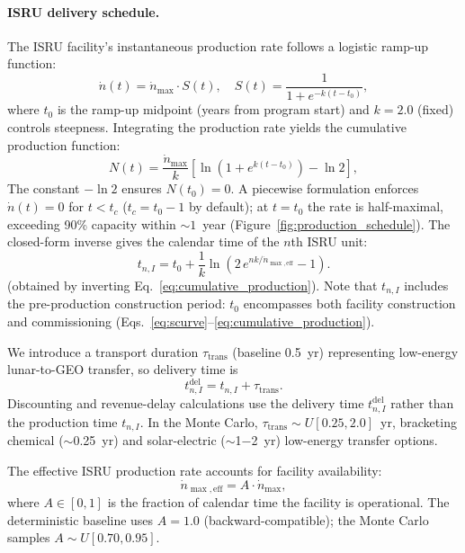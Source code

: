 \documentclass[preprint,12pt]{elsarticle}
\begin{document}
\paragraph{ISRU delivery schedule.} The ISRU facility's instantaneous production rate follows a logistic ramp-up function:
\begin{equation}
  \dot{n}(t) = \dot{n}_{\max} \cdot S(t), \quad S(t) = \frac{1}{1 + e^{-k(t - t_0)}},
  \label{eq:scurve}
\end{equation}
where $t_0$ is the ramp-up midpoint (years from program start) and $k = 2.0$ (fixed) controls steepness. Integrating the production rate yields the cumulative production function:
\begin{equation}
  N(t) = \frac{\dot{n}_{\max}}{k} \left[ \ln\!\left(1 + e^{k(t - t_0)}\right) - \ln 2 \right],
  \label{eq:cumulative_production}
\end{equation}
The constant $-\ln 2$ ensures $N(t_0) = 0$. A piecewise formulation enforces $\dot{n}(t) = 0$ for $t < t_c$ ($t_c = t_0 - 1$ by default); at $t = t_0$ the rate is half-maximal, exceeding 90\% capacity within ${\sim}1$~year (Figure~\ref{fig:production_schedule}). The closed-form inverse gives the calendar time of the $n$th ISRU unit:
\begin{equation}
  t_{n,I} = t_0 + \frac{1}{k} \ln\!\left(2\,e^{nk/\dot{n}_{\max,\mathrm{eff}}} - 1\right).
  \label{eq:production_schedule}
\end{equation}
(obtained by inverting Eq.~\ref{eq:cumulative_production}). Note that $t_{n,I}$ includes the pre-production construction period: $t_0$ encompasses both facility construction and commissioning (Eqs.~\ref{eq:scurve}--\ref{eq:cumulative_production}).

We introduce a transport duration $\tau_{\mathrm{trans}}$ (baseline 0.5~yr) representing low-energy lunar-to-GEO transfer, so delivery time is
\begin{equation}
  t_{n,I}^{\mathrm{del}} = t_{n,I} + \tau_{\mathrm{trans}}.
  \label{eq:delivery_time}
\end{equation}
Discounting and revenue-delay calculations use the delivery time $t_{n,I}^{\mathrm{del}}$ rather than the production time $t_{n,I}$. In the Monte Carlo, $\tau_{\mathrm{trans}} \sim U[0.25, 2.0]$~yr, bracketing chemical ($\sim$0.25~yr) and solar-electric ($\sim$1$-$2~yr) low-energy transfer options.

The effective ISRU production rate accounts for facility availability:
\begin{equation}
  \dot{n}_{\max,\mathrm{eff}} = A \cdot \dot{n}_{\max},
  \label{eq:availability}
\end{equation}
where $A \in [0,1]$ is the fraction of calendar time the facility is operational. The deterministic baseline uses $A = 1.0$ (backward-compatible); the Monte Carlo samples $A \sim U[0.70, 0.95]$.
\end{document}
